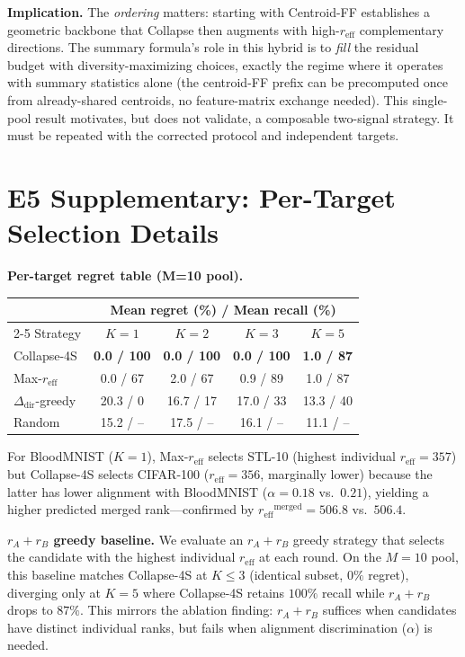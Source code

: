 \documentclass{article}
\newcommand{\reff}{\ensuremath{r_{\mathrm{eff}}}\xspace}
\newcommand{\Ddir}{\ensuremath{\Delta_{\mathrm{dir}}}\xspace}
\begin{document}
\textbf{Implication.}
The \emph{ordering} matters: starting with Centroid-FF establishes a
geometric backbone that Collapse then augments with high-$\reff$
complementary directions. The summary formula's role in this
hybrid is to \emph{fill} the residual budget with diversity-maximizing
choices, exactly the regime where it operates with summary statistics
alone (the centroid-FF prefix can be precomputed once from
already-shared centroids, no feature-matrix exchange needed).
This single-pool result motivates, but does not validate, a composable
two-signal strategy.  It must be repeated with the corrected protocol and
independent targets.

\section{E5 Supplementary: Per-Target Selection Details}
\label{app:e5_downstream}

\textbf{Per-target regret table (M=10 pool).}
\begin{center}
\setlength{\tabcolsep}{5pt}
\begin{tabular}{lcccc}
\toprule
& \multicolumn{4}{c}{Mean regret (\%) / Mean recall (\%)} \\
\cmidrule(lr){2-5}
Strategy & $K{=}1$ & $K{=}2$ & $K{=}3$ & $K{=}5$ \\
\midrule
Collapse-4S & \textbf{0.0 / 100} & \textbf{0.0 / 100} & \textbf{0.0 / 100} & \textbf{1.0 / 87} \\
Max-$\reff$ & 0.0 / 67 & 2.0 / 67 & 0.9 / 89 & 1.0 / 87 \\
$\Ddir$-greedy & 20.3 / 0 & 16.7 / 17 & 17.0 / 33 & 13.3 / 40 \\
Random & 15.2 / -- & 17.5 / -- & 16.1 / -- & 11.1 / -- \\
\bottomrule
\end{tabular}
\end{center}

For BloodMNIST ($K{=}1$), Max-$\reff$ selects STL-10
(highest individual $\reff{=}357$) but Collapse-4S selects CIFAR-100
($\reff{=}356$, marginally lower) because the latter has lower
alignment with BloodMNIST ($\alpha{=}0.18$ vs.\ $0.21$),
yielding a higher predicted merged rank---confirmed by
$\reff^{\mathrm{merged}}=506.8$ vs.\ $506.4$.

\textbf{$r_A{+}r_B$ greedy baseline.}
We evaluate an $r_A{+}r_B$ greedy strategy that selects
the candidate with the highest individual $\reff$ at each round.
On the $M{=}10$ pool, this baseline matches Collapse-4S at $K{\leq}3$
(identical subset, $0\%$ regret), diverging only at $K{=}5$ where
Collapse-4S retains $100\%$ recall while $r_A{+}r_B$ drops to $87\%$.
This mirrors the ablation finding: $r_A{+}r_B$ suffices when candidates
have distinct individual ranks, but fails when alignment
discrimination ($\alpha$) is needed.
\end{document}
